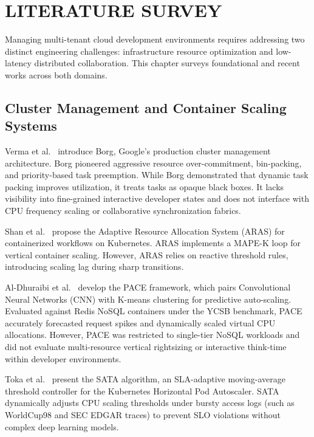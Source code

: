 \documentclass[12pt,a4paper]{report}
\begin{document}
\chapter{LITERATURE SURVEY}

Managing multi-tenant cloud development environments requires addressing two distinct engineering challenges: infrastructure resource optimization and low-latency distributed collaboration. This chapter surveys foundational and recent works across both domains.

\section{Cluster Management and Container Scaling Systems}
Verma et al.~\cite{borg} introduce Borg, Google's production cluster management architecture. Borg pioneered aggressive resource over-commitment, bin-packing, and priority-based task preemption. While Borg demonstrated that dynamic task packing improves utilization, it treats tasks as opaque black boxes. It lacks visibility into fine-grained interactive developer states and does not interface with CPU frequency scaling or collaborative synchronization fabrics.

Shan et al.~\cite{aras} propose the Adaptive Resource Allocation System (ARAS) for containerized workflows on Kubernetes. ARAS implements a MAPE-K loop for vertical container scaling. However, ARAS relies on reactive threshold rules, introducing scaling lag during sharp transitions.

Al-Dhuraibi et al.~\cite{pace} develop the PACE framework, which pairs Convolutional Neural Networks (CNN) with K-means clustering for predictive auto-scaling. Evaluated against Redis NoSQL containers under the YCSB benchmark, PACE accurately forecasted request spikes and dynamically scaled virtual CPU allocations. However, PACE was restricted to single-tier NoSQL workloads and did not evaluate multi-resource vertical rightsizing or interactive think-time within developer environments.

Toka et al.~\cite{sata} present the SATA algorithm, an SLA-adaptive moving-average threshold controller for the Kubernetes Horizontal Pod Autoscaler. SATA dynamically adjusts CPU scaling thresholds under bursty access logs (such as WorldCup98 and SEC EDGAR traces) to prevent SLO violations without complex deep learning models.
\end{document}
